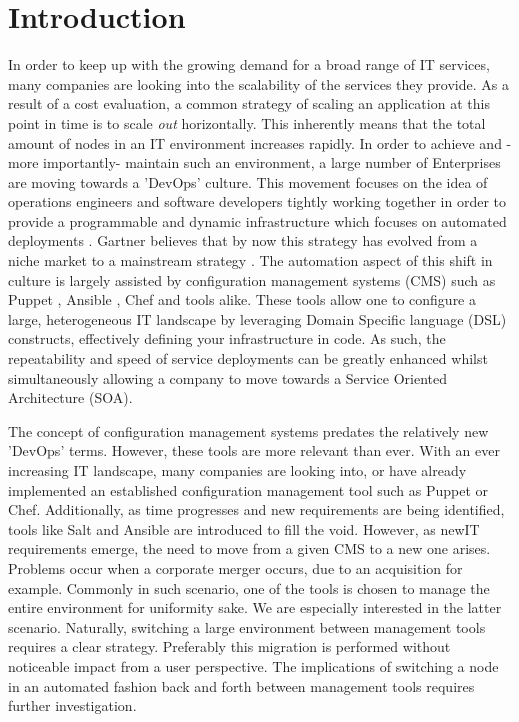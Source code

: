 \section{Introduction}\label{sec:introduction}
In order to keep up with the growing demand for a broad range of IT services, many companies are looking into the scalability of the services they provide. As a result of a cost evaluation, a common strategy of scaling an application at this point in time is to scale \textit{out} horizontally. This inherently means that the total amount of nodes in an IT environment increases rapidly. In order to achieve and -more importantly- maintain such an environment, a large number of Enterprises are moving towards a 'DevOps' culture. This movement focuses on the idea of operations engineers and software developers tightly working together in order to provide a programmable and dynamic infrastructure which focuses on automated deployments \cite{loukides_2012}. Gartner believes that by now this strategy has evolved from a niche market to a mainstream strategy \cite{gartner_2015}. The automation aspect of this shift in culture is largely assisted by configuration management systems (CMS) such as Puppet \cite{whatispuppet}, Ansible \cite{whatisansible}, Chef \cite{whatischef} and tools alike. These tools allow one to configure a large, heterogeneous IT landscape by leveraging Domain Specific language (DSL)  constructs, effectively defining your infrastructure in code. As such, the repeatability and speed of service deployments can be greatly enhanced whilst simultaneously allowing a company to move towards a Service Oriented Architecture (SOA).

The concept of configuration management systems predates the relatively new 'DevOps' terms. However, these tools are more relevant than ever. With an ever increasing IT landscape, many companies are looking into, or have already implemented an established configuration management tool such as Puppet or Chef. Additionally, as time progresses and new requirements are being identified, tools like Salt and Ansible are introduced to fill the void. However, as newIT requirements emerge, the need to move from a given CMS to a new one arises. Problems occur when a corporate merger occurs, due to an acquisition for example. Commonly in such scenario, one of the tools is chosen to manage the entire environment for uniformity sake. We are especially interested in the latter scenario. Naturally, switching a large environment between management tools requires a clear strategy. Preferably this migration is performed without noticeable impact from a user perspective. The implications of switching a node in an automated fashion back and forth between management tools requires further investigation. 

